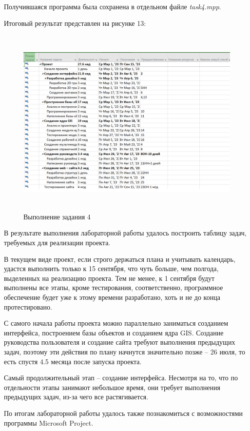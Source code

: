 \newpage
Получившаяся программа была сохранена в отдельном файле \textit{task4.mpp}.

Итоговый результат представлен на рисунке 13:
\FloatBarrier
\begin{figure}[h]	
	\begin{center}
		\includegraphics[width=\linewidth, height=9.5cm]{inc/result.png}
	\end{center}
	\captionsetup{justification=centering}
	\caption{Выполнение задания 4}
\end{figure}
\FloatBarrier

В результате выполнения лабораторной работы удалось построить таблицу задач, требуемых для реализации проекта.

В текущем виде проект, если строго держаться плана и учитывать календарь, удастся выполнить только к 15 сентября, что чуть больше, чем полгода, выделенных на реализацию проекта. 
Тем не менее, к 1 сентября будут выполнены все этапы, кроме тестирования, соответственно, программное обеспечение будет уже к этому времени разработано, хоть и не до конца протестировано.

С самого начала работы проекта можно параллельно заниматься созданием интерфейса, построением базы объектов и созданием ядра GIS.
Создание руководства пользователя и создание сайта требуют выполнения предыдущих задач, поэтому эти действия по плану начнутся значительно позже -- 26 июля, то есть спустя 4.5 месяца после запуска проекта.

Самый продолжительный этап -- создание интерфейса. Несмотря на то, что по отдельности этапы занимают небольшое время, они требует выполнения предыдущих задач, из-за чего все растягивается.

По итогам лабораторной работы удалось также познакомиться с возможностями программы Microsoft Project.